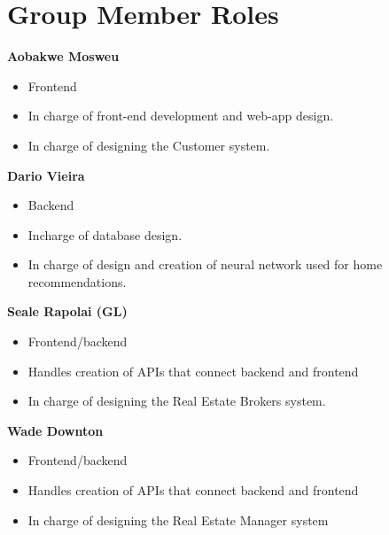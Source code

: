 \documentclass[12pt]{article}
\begin{document}
	\section{Group Member Roles}
		\begin{flushleft}
		\textbf{Aobakwe Mosweu}
		\begin{itemize} 
			\item Frontend
			\item In charge of front-end development and web-app design.
			\item In charge of designing the Customer system.
		\end{itemize}
		
		\textbf{Dario Vieira}
		\begin{itemize}
			\item Backend
			\item Incharge of database design.
			\item In charge of design and creation of neural network used for home recommendations.
		\end{itemize}
		
		\textbf{Seale Rapolai (GL)}
		\begin{itemize}
			\item Frontend/backend
			\item Handles creation of APIs that connect backend and frontend
			\item In charge of designing the Real Estate Brokers system.
		\end{itemize}
		
		\textbf{Wade Downton}
		\begin{itemize}
			\item Frontend/backend
			\item Handles creation of APIs that connect backend and frontend
			\item In charge of designing the Real Estate Manager system
		\end{itemize}
	
	\end{flushleft}
	
	
\end{document}
